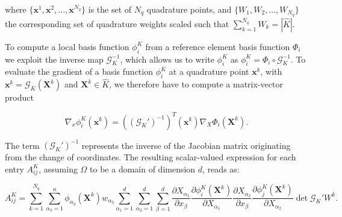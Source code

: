 where $\lbrace \boldsymbol{x}^1, \boldsymbol{x}^2, ..., \boldsymbol{x}^{N_q} \rbrace$ is the set of $N_q$ quadrature points, and $\lbrace W_1, W_2, ..., W_{N_q} \rbrace$ the corresponding set of quadrature weights scaled such that $\sum_{k=1}^{N_q} W_k = |\hat{K}|$. 

To compute a local basis function $\phi_i^K$ from a reference element basis function $\Phi_i$ we exploit the inverse map $\mathcal{G}_K^{-1}$, which allows us to write $\phi_i^K$ as $\phi_i^K = \Phi_i \circ \mathcal{G}_K^{-1}$. To evaluate the gradient of a basis function $\phi_i^K$ at a quadrature point $\boldsymbol{x}^k$, with $\boldsymbol{x}^k = \mathcal{G}_K(\boldsymbol{X}^k)$ and $\boldsymbol{X}^k \in \hat{K}$, we therefore have to compute a matrix-vector product

\begin{equation}
\nabla_x \phi_i^K(\boldsymbol{x}^k) = ((\mathcal{G}_K')^{-1})^{T}(\boldsymbol{x}^k) \nabla_X \Phi_i(\boldsymbol{X}^k).
\end{equation}

The term $(\mathcal{G}_K')^{-1}$ represents the inverse of the Jacobian matrix originating from the change of coordinates. The resulting scalar-valued expression for each entry $A_{ij}^K$, assuming $\Omega$ to be a domain of dimension $d$, reads as:

\begin{equation}
\label{eq:quadrature}
A_{ij}^K = \sum_{k=1}^{N_q} \sum_{\alpha_3=1}^n \phi_{\alpha_3}(\boldsymbol{X}^k) w_{\alpha_3} \sum_{\alpha_1=1}^d \sum_{\alpha_2=1}^d \sum_{\beta=1}^d \frac{\partial X_{\alpha_1}}{\partial x_{\beta}} \frac{\partial \phi_i^K(\boldsymbol{X}^k)}{\partial X_{\alpha_1}} \frac{\partial X_{\alpha_2}}{\partial x_{\beta}} \frac{\partial \phi_j^K(\boldsymbol{X}^k)}{\partial X_{\alpha_2}} \operatorname{det} \mathcal{G}_K' W^k.
\end{equation}


